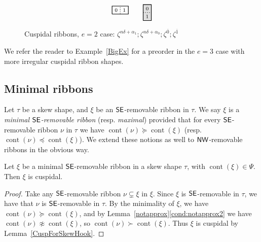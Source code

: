 \documentclass[Unicode,ALCO]{cedram}
\newcommand{\0}{{\bar 0}}
\newcommand{\nnww}{{\sf NW}}
\newcommand{\ssee}{{\sf SE}}
\def\cont{{\operatorname{cont}}}
\newcommand{\hackcenter}[1]{
 \xy (0,0)*{#1}; \endxy}
\begin{document}
\begin{exam}
\begin{figure}
\begin{align*}
{\begin{tikzpicture}[scale=0.4]
\draw[thick]  (0,0)--(2,0)--(2,1)--(0,1)--(0,0);
\draw[thick, dotted] (1,0)--(1,1);
\node at (0.5,0.5){$\scriptstyle0 $};
\node at (1.5,0.5){$\scriptstyle1 $};
\end{tikzpicture}
}
\qquad
\hackcenter{
\begin{tikzpicture}[scale=0.4]
\fill[fill=lightgray!50] (0,0)--(1,0)--(1,2)--(0,2)--(0,0);
\draw[thick]  (0,0)--(1,0)--(1,2)--(0,2)--(0,0);
\draw[thick, dotted] (0,1)--(1,1);
\node at (0.5,0.5){$\scriptstyle1 $};
\node at (0.5,1.5){$\scriptstyle0 $};
\end{tikzpicture}
}
\end{align*}
\caption{Cuspidal ribbons, \(e=2\) case: \( \zeta^{n\delta + \alpha_1}; \zeta^{n \delta + \alpha_0}; \zeta^{ \overline{0}}; \zeta^{\overline{1}}\)}
\label{fig:e2cusps}      
\end{figure}
\end{exam}

We refer the reader to Example~\ref{BigEx} for a preorder in the \(e=3\) case with more irregular cuspidal ribbon shapes.


\subsection{Minimal ribbons}
Let \(\tau\) be a skew shape, and \(\xi\) be an \(\ssee\)-removable ribbon in \(\tau\). We say \(\xi\) is a {\em minimal \(\ssee\)-removable ribbon} (resp. {\em maximal}) provided that for every \(\ssee\)-removable ribbon \(\nu\) in \(\tau\) we have \(\cont(\nu) \succeq \cont(\xi)\) (resp. \(\cont(\nu) \preceq \cont(\xi)\)). We extend these notions as well to \(\nnww\)-removable ribbons in the obvious way.

\begin{lemma}\label{minremiscusp}
Let \(\xi\) be a minimal \(\ssee\)-removable ribbon in a skew shape \(\tau\), with \(\cont(\xi) \in \Psi\). Then \(\xi\) is cuspidal.
\end{lemma}
\begin{proof}
Take any \(\ssee\)-removable ribbon \(\nu \subsetneq \xi\) in \(\xi\). Since \(\xi\) is \(\ssee\)-removable in \(\tau\), we have that \(\nu\) is \(\ssee\)-removable in \(\tau\). By the minimality of \(\xi\), we have \(\cont(\nu) \succeq \cont(\xi)\), and by Lemma~\ref{notapprox}\eqref{cond:notapprox2} we have \(\cont(\nu) \not \approx \cont(\xi)\), so \(\cont(\nu) \succ \cont(\xi)\). Thus \(\xi\) is cuspidal by Lemma~\ref{CuspForSkewHook}.
\end{proof}
\end{document}
